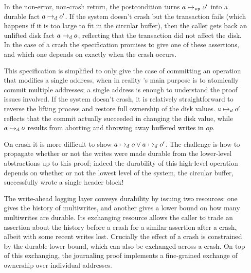 In the non-error, non-crash return, the postcondition turns $a \mapsto_{\mathit{op}} o'$
into a durable fact $a \mapsto_d o'$. If the system doesn't crash but the
transaction fails (which happens if it is too large to fit in the circular
buffer), then the caller gets back an unlifted disk fact $a \mapsto_d o$,
reflecting that the transaction did not affect the disk. In the case of a crash
the specification promises to give one of these assertions, and which one
depends on exactly when the crash occurs.

This specification is simplified to only give the case of committing an
operation that modifies a single address, when in reality 's main purpose
is to atomically commit multiple addresses; a single address is enough to
understand the proof issues involved. If the system doesn't crash, it is
relatively straightforward to reverse the lifting process and restore full
ownership of the disk values. $a \mapsto_d o'$ reflects that the commit
actually succeeded in changing the disk value, while $a \mapsto_d o$ results
from aborting and throwing away buffered writes in $op$.

On crash it is more difficult to show $a \mapsto_d o \lor a \mapsto_d o'$.
The challenge is how to propagate whether or not the writes were made durable
from the lower-level abstractions up to this proof; indeed the durability of
this high-level operation depends on whether or not the lowest level of the
system, the circular buffer, successfully wrote a single header block!

The write-ahead logging layer conveys durability by issuing two resources: one
gives the history of multiwrites, and another gives a lower bound on how many
multiwrites are durable. Its exchanging resource allows the caller to trade an
assertion about the history before a crash for a similar assertion after a
crash, albeit with some recent writes lost. Crucially the effect of a crash is
constrained by the durable lower bound, which can also be exchanged across a
crash. On top of this exchanging, the journaling proof implements a fine-grained
exchange of ownership over individual addresses.

